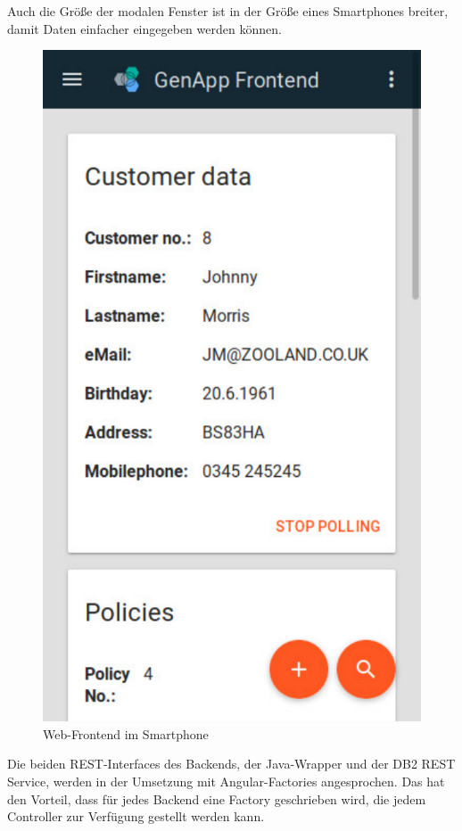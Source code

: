 Auch die Größe der modalen Fenster ist in der Größe eines Smartphones breiter, damit Daten einfacher eingegeben werden
können.

\begin{figure}[h]
 \centering
   \includegraphics[scale=0.64]{images/kapitel_4/frontend_smartphone.pdf}
 \caption{Web-Frontend im Smartphone}
 \label{fig:frontend_smartphone}
\end{figure}

Die beiden REST-Interfaces des Backends, der Java-Wrapper und der DB2 REST Service, werden in der Umsetzung mit
Angular-Factories angesprochen. Das hat den Vorteil, dass für jedes Backend eine Factory geschrieben wird, die jedem
Controller zur Verfügung gestellt werden kann.


